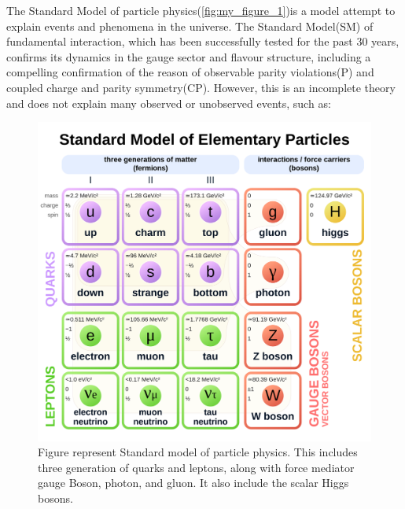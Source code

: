 The Standard Model of particle physics(\autoref{fig:my_figure_1})is a model attempt to explain events and phenomena in the universe. The Standard Model(SM) of fundamental interaction, which has been successfully tested for the past 30 years, confirms its dynamics in the gauge sector and flavour structure, including a compelling confirmation of the reason of observable parity violations(P) and coupled charge and parity symmetry(CP). However, this is an incomplete theory and does not explain many  observed or unobserved events, such as:
\begin{figure}[H]
    \centering
    \includegraphics[scale =0.1]{figure_1/Standard_Model_of_Elementary_Particles.svg.png}
    \caption{Figure represent Standard model of particle physics. This includes three generation of quarks and leptons, along with force mediator gauge Boson, photon, and gluon. It also include the scalar Higgs bosons.}
    \label{fig:my_figure_1}
\end{figure}

